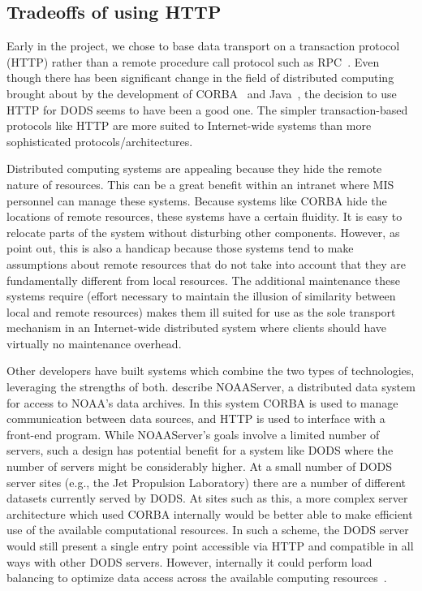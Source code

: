\documentclass{article}
\begin{document}
\subsection{Tradeoffs of using HTTP}
\label{http}

Early in the project, we chose to base data transport on a transaction
protocol (\acs{HTTP}) rather than a remote procedure call protocol such as
\ac{RPC}~\cite{sun:rpc}. Even though there has been significant change in the
field of distributed computing brought about by the development of
\ac{CORBA}~\cite{siegel:corba-prog} and Java~\cite{harold:java-net}, the
decision to use \acs{HTTP} for \ac{DODS} seems to have been a good one. The
simpler transaction-based protocols like \acs{HTTP} are more suited to
Internet-wide systems than more sophisticated protocols/architectures.

Distributed computing systems are appealing because they hide the remote
nature of resources. This can be a great benefit within an intranet where
\ac{MIS} personnel can manage these systems. Because systems like \ac{CORBA}
hide the locations of remote resources, these systems have a certain
fluidity. It is easy to relocate parts of the system without disturbing other
components.  However, as~ point out, this is also
a handicap because those systems tend to make assumptions about remote
resources that do not take into account that they are fundamentally different
from local resources. The additional maintenance these systems require
(effort necessary to maintain the illusion of similarity between local and
remote resources) makes them ill suited for use as the sole transport
mechanism in an Internet-wide distributed system where clients should have
virtually no maintenance overhead.

Other developers have built systems which combine the two types of
technologies, leveraging the strengths of both.
 describe \acs{NOAA}Server, a distributed data
system for access to \acs{NOAA}'s data archives. In this system \ac{CORBA} is
used to manage communication between data sources, and \acs{HTTP} is used to
interface with a front-end program. While \acs{NOAA}Server's goals involve a
limited number of servers, such a design has potential benefit for a system
like \ac{DODS} where the number of servers might be considerably higher. At a
small number of \ac{DODS} server sites (e.g., the Jet Propulsion Laboratory)
there are a number of different datasets currently served by \ac{DODS}. At
sites such as this, a more complex server architecture which used \ac{CORBA}
internally would be better able to make efficient use of the available
computational resources. In such a scheme, the \ac{DODS} server would still
present a single entry point accessible via \acs{HTTP} and compatible in all
ways with other \ac{DODS} servers. However, internally it could perform load
balancing to optimize data access across the available computing
resources~\cite{hamby:private-comm}.
\end{document}
